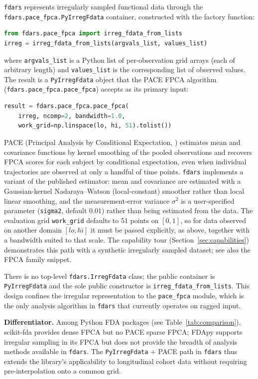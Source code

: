 \texttt{fdars} represents irregularly sampled functional data through the
\texttt{fdars.pace\_fpca.PyIrregFdata} container, constructed with the factory
function:

\begin{lstlisting}[language=Python,style=fdarsinput]
from fdars.pace_fpca import irreg_fdata_from_lists
irreg = irreg_fdata_from_lists(argvals_list, values_list)
\end{lstlisting}

where \texttt{argvals\_list} is a Python list of per-observation grid arrays
(each of arbitrary length) and \texttt{values\_list} is the corresponding list
of observed values.  The result is a \texttt{PyIrregFdata} object that the
PACE FPCA algorithm (\texttt{fdars.pace\_fpca.pace\_fpca}) accepts as its
primary input:

\begin{lstlisting}[language=Python,style=fdarsinput]
result = fdars.pace_fpca.pace_fpca(
    irreg, ncomp=2, bandwidth=1.0,
    work_grid=np.linspace(lo, hi, 51).tolist())
\end{lstlisting}

PACE (Principal Analysis by Conditional Expectation,
\citealt{yao_muller_wang_2005}) estimates mean and covariance functions by
kernel smoothing of the pooled observations and recovers FPCA scores for each
subject by conditional expectation, even when individual trajectories are
observed at only a handful of time points.  \texttt{fdars} implements a
variant of the published estimator: mean and covariance are estimated with a
Gaussian-kernel Nadaraya--Watson (local-constant) smoother rather than local
linear smoothing, and the measurement-error variance $\sigma^2$ is a
user-specified parameter (\texttt{sigma2}, default $0.01$) rather than being
estimated from the data.  The evaluation grid \texttt{work\_grid} defaults to
51 points on $[0, 1]$, so for data observed on another domain
$[\mathit{lo}, \mathit{hi}]$ it must be passed explicitly, as above, together
with a bandwidth suited to that scale.  The capability tour
(Section~\ref{sec:capabilities}) demonstrates this path with a synthetic
irregularly sampled dataset; see also the FPCA family snippet.

There is no top-level \texttt{fdars.IrregFdata} class; the public container is
\texttt{PyIrregFdata} and the sole public constructor is
\texttt{irreg\_fdata\_from\_lists}.  This design confines the irregular
representation to the \texttt{pace\_fpca} module, which is the only analysis
algorithm in \texttt{fdars} that currently operates on ragged input.

\textbf{Differentiator.}  Among Python FDA packages (see
Table~\ref{tab:comparison}), scikit-fda provides dense FPCA but no PACE sparse
FPCA; FDApy supports irregular sampling in its FPCA but does not provide the
breadth of analysis methods available in \texttt{fdars}.  The
\texttt{PyIrregFdata} + PACE path in \texttt{fdars} thus extends the
library's applicability to longitudinal cohort data without requiring
pre-interpolation onto a common grid.
